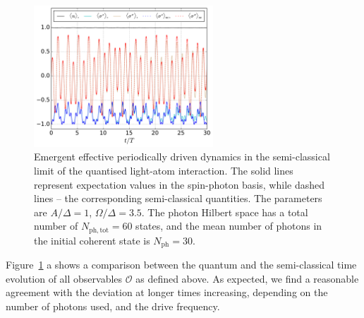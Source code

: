 \documentclass{SciPost}
\newcommand\0{\scalebox{-1}[1]{0}}
\begin{document}
\begin{figure}
	\centering
	\includegraphics[width=0.6\textwidth]{example3.pdf}
	\caption{Emergent effective periodically driven dynamics in the semi-classical limit of the quantised light-atom interaction. The solid lines represent expectation values in the spin-photon basis, while dashed lines -- the corresponding semi-classical quantities. The parameters are $A/\Delta=1$, $\Omega/\Delta=3.5$. The photon Hilbert space has a total number of $N_\mathrm{ph, tot}=60$ states, and the mean number of photons in the initial coherent state is $N_\mathrm{ph}=30$.}
	\label{fig:example3}
\end{figure}

Figure~\ref{fig:example3} a shows a comparison between the quantum and the semi-classical time evolution of all observables $\mathcal{O}$ as defined above. As expected, we find a reasonable agreement with the deviation at longer times increasing, depending on the number of photons used, and the drive frequency.
\end{document}
